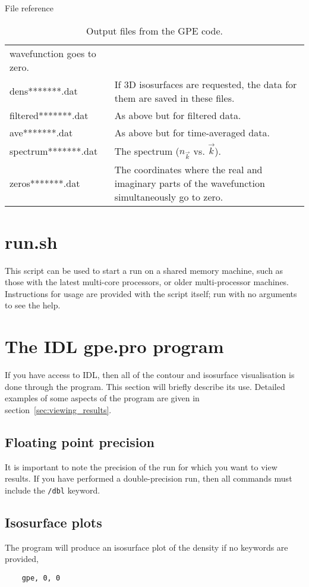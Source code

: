 \begin{chapter}{\label{cha:file_reference}File reference}
\begin{table}[!ht]
\begin{tabular}{lp{}}
      wavefunction goes to zero. \\
      dens*******.dat & If 3D isosurfaces are requested, the data for them are
      saved in these files. \\
      filtered*******.dat & As above but for filtered data. \\
      ave*******.dat & As above but for time-averaged data. \\
      spectrum*******.dat & The spectrum ($n_{\vec{k}}$ vs. $\vec{k}$). \\
      zeros*******.dat & The coordinates where the real and imaginary parts of
      the wavefunction simultaneously go to zero. \\
      \hline
    \end{tabular}
    \caption{\label{tab:output}Output files from the GPE code.}
  \end{table}

  \section{run.sh}
  This script can be used to start a run on a shared memory machine, such as
  those with the latest multi-core processors, or older multi-processor
  machines.  Instructions for usage are provided with the script itself; run
  with no arguments to see the help.

  \section{The IDL gpe.pro program}
  If you have access to IDL, then all of the contour and isosurface
  visualisation is done through the  program.  This section
  will briefly describe its use.  Detailed examples of some aspects of the
  program are given in section~\ref{sec:viewing_results}.

  \subsection{Floating point precision}
  It is important to note the precision of the run for which you want to view
  results.  If you have performed a double-precision run, then all 
  commands must include the \verb"/dbl" keyword.

  \subsection{Isosurface plots}
  The program will produce an isosurface plot of the density if no keywords are
  provided, \eg
  \begin{Verbatim}
    gpe, 0, 0
  \end{Verbatim}


\end{chapter}
